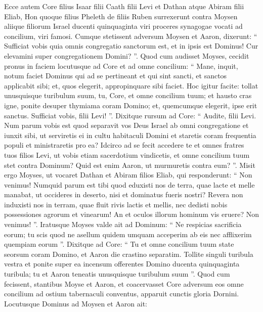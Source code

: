 \begin{biblechapter}
\begin{biblechapter}
\begin{biblechapter}
\begin{biblechapter}
\begin{biblechapter}
\begin{biblechapter}
\begin{biblechapter}
\begin{biblechapter}
\begin{biblechapter}
\begin{biblechapter}
\begin{biblechapter}
\begin{biblechapter}
\begin{biblechapter}
\begin{biblechapter}
\begin{biblechapter}
\begin{biblechapter}
\verse Ecce autem Core filius Isaar filii Caath filii Levi et Dathan atque Abiram filii Eliab, Hon quoque filius Pheleth de filiis Ruben 
\verse surrexerunt contra Moysen aliique filiorum Israel ducenti quinquaginta viri proceres synagogae vocati ad concilium, viri famosi. 
\verse Cumque stetissent adversum Moysen et Aaron, dixerunt: “ Sufficiat vobis quia omnis congregatio sanctorum est, et in ipsis est Dominus! Cur elevamini super congregationem Domini? ”.
 \verse Quod cum audisset Moyses, cecidit pronus in faciem 
\verse locutusque ad Core et ad omne concilium: “ Mane, inquit, notum faciet Dominus qui ad se pertineant et qui sint sancti, et sanctos applicabit sibi; et, quos elegerit, appropinquare sibi faciet. 
\verse Hoc igitur facite: tollat unusquisque turibulum suum, tu, Core, et omne concilium tuum; 
\verse et hausto cras igne, ponite desuper thymiama coram Domino; et, quemcumque elegerit, ipse erit sanctus. Sufficiat vobis, filii Levi! ”.
 \verse Dixitque rursum ad Core: “ Audite, filii Levi. 
\verse Num parum vobis est quod separavit vos Deus Israel ab omni congregatione et iunxit sibi, ut serviretis ei in cultu habitaculi Domini et staretis coram frequentia populi et ministraretis pro ea? 
\verse Idcirco ad se fecit accedere te et omnes fratres tuos filios Levi, ut vobis etiam sacerdotium vindicetis, 
\verse et omne concilium tuum stet contra Dominum? Quid est enim Aaron, ut murmuretis contra eum? ”.
 \verse Misit ergo Moyses, ut vocaret Dathan et Abiram filios Eliab, qui responderunt: “ Non venimus! 
\verse Numquid parum est tibi quod eduxisti nos de terra, quae lacte et melle manabat, ut occideres in deserto, nisi et dominatus fueris nostri? 
\verse Revera non induxisti nos in terram, quae fluit rivis lactis et mellis, nec dedisti nobis possessiones agrorum et vinearum! An et oculos illorum hominum vis eruere? Non venimus! ”.
 \verse Iratusque Moyses valde ait ad Dominum: “ Ne respicias sacrificia eorum; tu scis quod ne asellum quidem umquam acceperim ab eis nec afflixerim quempiam eorum ”.
 \verse Dixitque ad Core: “ Tu et omne concilium tuum state seorsum coram Domino, et Aaron die crastino separatim. 
\verse Tollite singuli turibula vestra et ponite super ea incensum offerentes Domino ducenta quinquaginta turibula; tu et Aaron teneatis unusquisque turibulum suum ”. 
\verse Quod cum fecissent, stantibus Moyse et Aaron, 
\verse et coacervasset Core adversum eos omne concilium ad ostium tabernaculi conventus, apparuit cunctis gloria Dornini.
 \verse Locutusque Dominus ad Moysen et Aaron ait: 

\end{biblechapter}
\end{biblechapter}
\end{biblechapter}
\end{biblechapter}
\end{biblechapter}
\end{biblechapter}
\end{biblechapter}
\end{biblechapter}
\end{biblechapter}
\end{biblechapter}
\end{biblechapter}
\end{biblechapter}
\end{biblechapter}
\end{biblechapter}
\end{biblechapter}
\end{biblechapter}
